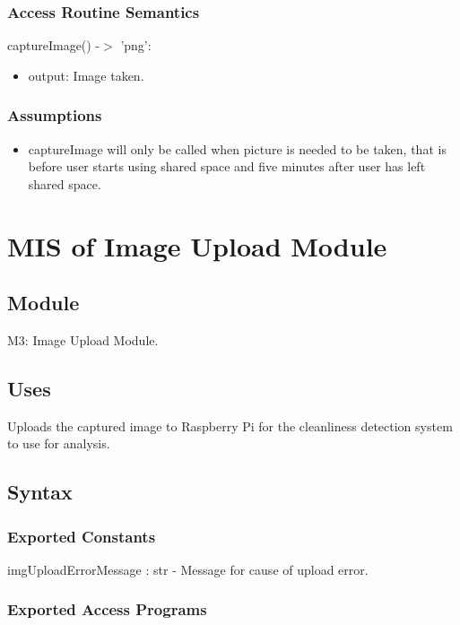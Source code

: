 \documentclass[12pt, titlepage]{article}
\begin{document}
\subsubsection{Access Routine Semantics}

\noindent captureImage() -$>$ 'png':
\begin{itemize}
\item output: Image taken.
\end{itemize}

\subsubsection{Assumptions}
\begin{itemize}
\item captureImage will only be called when picture is needed to be taken, that is before user starts using shared space and five minutes after user has left shared space.
\end{itemize}


\newpage

\section{MIS of Image Upload Module} \label{Module} 

\subsection{Module}

M3: Image Upload Module.

\subsection{Uses}
Uploads the captured image to Raspberry Pi for the cleanliness detection system to use for analysis.

\subsection{Syntax}

\subsubsection{Exported Constants}
imgUploadErrorMessage : str - Message for cause of upload error.

\subsubsection{Exported Access Programs}
\end{document}
